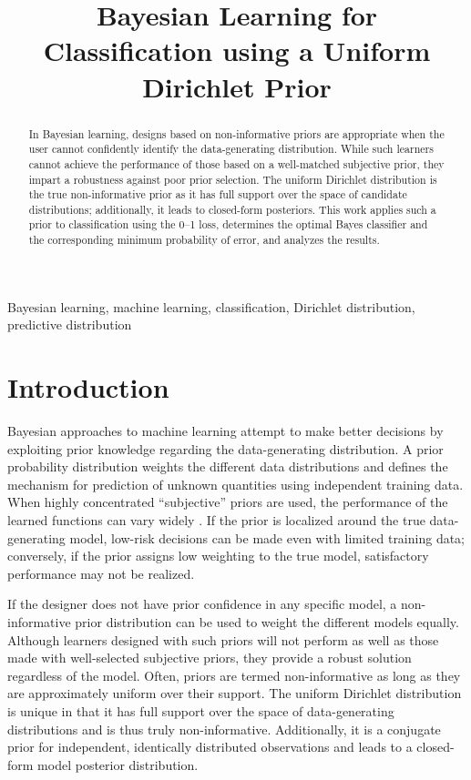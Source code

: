 \documentclass[conference]{IEEEtran}
\title{Bayesian Learning for Classification using a Uniform Dirichlet Prior}
\author{
\IEEEauthorblockN{Paul Rademacher}
\IEEEauthorblockA{\textit{Radar Division}\\ \textit{U.S. Naval Research Laboratory}\\ Washington, DC, USA\\ paul.rademacher@nrl.navy.mil}
\and
\IEEEauthorblockN{Milo\v{s} Doroslova\v{c}ki}
\IEEEauthorblockA{\textit{Department of Electrical and Computer Engineering}\\ \textit{The George Washington University}\\ Washington, DC, USA\\ doroslov@gwu.edu}
}
\begin{document}
\maketitle

\begin{abstract}
In Bayesian learning, designs based on non-informative priors are appropriate when the user cannot confidently identify the data-generating distribution. While such learners cannot achieve the performance of those based on a well-matched subjective prior, they impart a robustness against poor prior selection. The uniform Dirichlet distribution is the true non-informative prior as it has full support over the space of candidate distributions; additionally, it leads to closed-form posteriors. This work applies such a prior to classification using the 0--1 loss, determines the optimal Bayes classifier and the corresponding minimum probability of error, and analyzes the results.
\end{abstract}

\begin{IEEEkeywords}
Bayesian learning, machine learning, classification, Dirichlet distribution, predictive distribution
\end{IEEEkeywords}




\section{Introduction}

Bayesian approaches to machine learning attempt to make better decisions by exploiting prior knowledge regarding the data-generating distribution. A prior probability distribution weights the different data distributions and defines the mechanism for prediction of unknown quantities using independent training data. When highly concentrated ``subjective'' priors are used, the performance of the learned functions can vary widely \cite{box}. If the prior is localized around the true data-generating model, low-risk decisions can be made even with limited training data; conversely, if the prior assigns low weighting to the true model, satisfactory performance may not be realized. 

If the designer does not have prior confidence in any specific model, a non-informative prior distribution can be used to weight the different models equally. Although learners designed with such priors will not perform as well as those made with well-selected subjective priors, they provide a robust solution regardless of the model. Often, priors are termed non-informative as long as they are approximately uniform over their support. The uniform Dirichlet distribution is unique in that it has full support over the space of data-generating distributions and is thus truly non-informative. Additionally, it is a conjugate prior \cite{theodoridis-ML} for independent, identically distributed observations and leads to a closed-form model posterior distribution.
\end{document}
